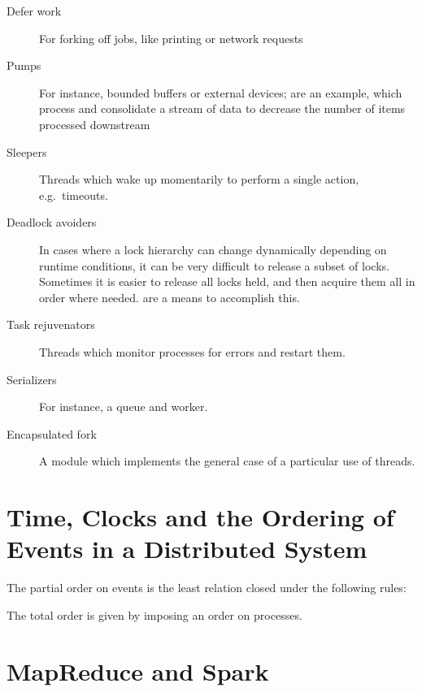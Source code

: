 \documentclass{article}
\begin{document}
\begin{description}
\item[Defer work] For forking off jobs, like printing or network requests
\item[Pumps] For instance, bounded buffers or external devices;
   are an example, which process and consolidate
  a stream of data to decrease the number of items processed
  downstream
\item[Sleepers] Threads which wake up momentarily to perform a single
  action, e.g.\ timeouts.
\item[Deadlock avoiders] In cases where a lock hierarchy can change
  dynamically depending on runtime conditions, it can be very
  difficult to release a subset of locks. Sometimes it is easier to
  release all locks held, and then acquire them all in order where
  needed.  are a means to accomplish this.
\item[Task rejuvenators] Threads which monitor processes for errors
  and restart them.
\item[Serializers] For instance, a queue and worker.
\item[Encapsulated fork] A module which implements the general case of
  a particular use of threads.
\end{description}

\section{Time, Clocks and the Ordering of Events in a Distributed System}

The partial order on events is the least relation closed under the
following rules:

The total order is given by imposing an order on processes. 

\section{MapReduce and Spark}
\end{document}
